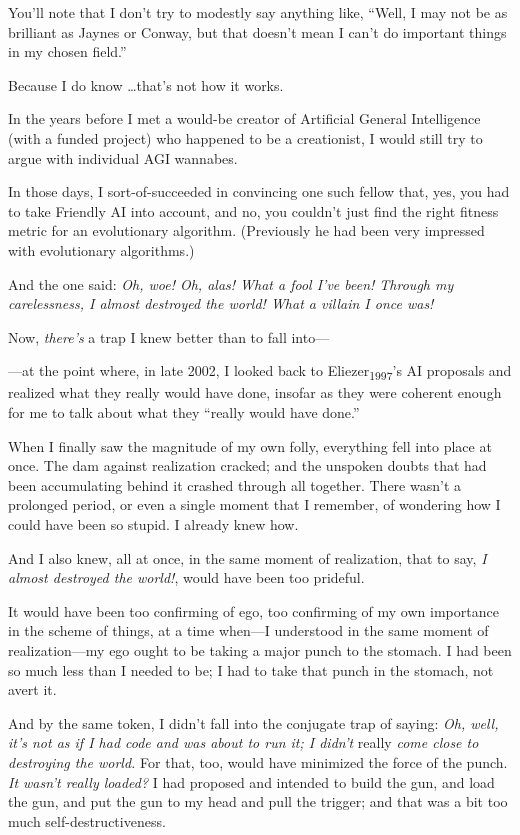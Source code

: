 {
 You'll note that I don't try to
modestly say anything like, ``Well, I may not be as
brilliant as Jaynes or Conway, but that doesn't mean I
can't do important things in my chosen
field.''}

{
 Because I do know \ldots that's not how it works.}

\myendsectiontext


{
 In the years before I met a would-be creator of Artificial General
Intelligence (with a funded project) who happened to be a creationist,
I would still try to argue with individual AGI wannabes. }

{
 In those days, I sort-of-succeeded in convincing one such fellow
that, yes, you had to take Friendly AI into account, and no, you
couldn't just find the right fitness metric for an
evolutionary algorithm. (Previously he had been very impressed with
evolutionary algorithms.)}

{
 And the one said: \textit{Oh, woe! Oh, alas! What a fool
I've been! Through my carelessness, I almost destroyed
the world! What a villain I once was!}}

{
 Now, \textit{there's} a trap I knew better than to
fall into---}

{
 {}---at the point where, in late 2002, I looked back to
Eliezer\textsubscript{1997}'s AI proposals and realized
what they really would have done, insofar as they were coherent enough
for me to talk about what they ``really would have
done.''}

{
 When I finally saw the magnitude of my own folly, everything fell
into place at once. The dam against realization cracked; and the
unspoken doubts that had been accumulating behind it crashed through
all together. There wasn't a prolonged period, or even
a single moment that I remember, of wondering how I could have been so
stupid. I already knew how.}

{
 And I also knew, all at once, in the same moment of realization,
that to say, \textit{I almost destroyed the world!}, would have been
too prideful.}

{
 It would have been too confirming of ego, too confirming of my own
importance in the scheme of things, at a time when---I understood in
the same moment of realization---my ego ought to be taking a major
punch to the stomach. I had been so much less than I needed to be; I
had to take that punch in the stomach, not avert it.}

{
 And by the same token, I didn't fall into the
conjugate trap of saying: \textit{Oh, well, it's not as
if I had code and was about to run it; I didn't} really
\textit{come close to destroying the world.} For that, too, would have
minimized the force of the punch. \textit{It wasn't
really loaded?} I had proposed and intended to build the gun, and load
the gun, and put the gun to my head and pull the trigger; and that was
a bit too much self-destructiveness.}

